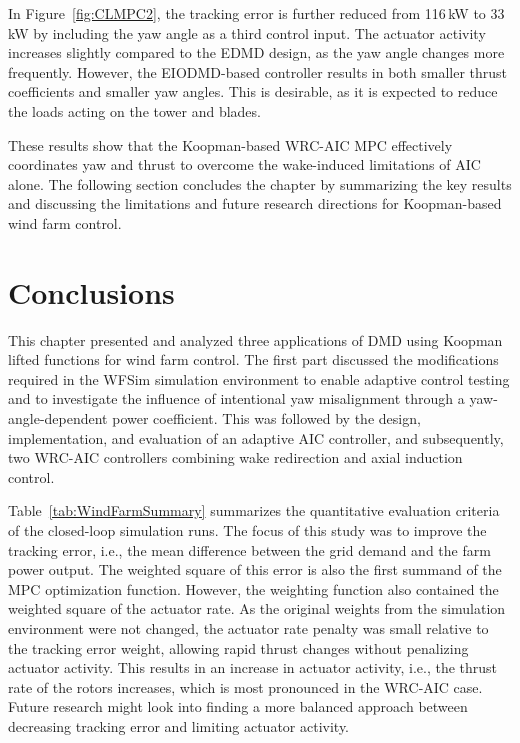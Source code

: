 In Figure~\ref{fig:CLMPC2}, the tracking error is further reduced from 116\,kW to 33\,kW by including the yaw angle as a third control input. The actuator activity increases slightly compared to the EDMD design, as the yaw angle changes more frequently. However, the EIODMD-based controller results in both smaller thrust coefficients and smaller yaw angles. This is desirable, as it is expected to reduce the loads acting on the tower and blades.

These results show that the Koopman-based WRC-AIC MPC effectively coordinates yaw and thrust to overcome the wake-induced limitations of AIC alone. The following section concludes the chapter by summarizing the key results and discussing the limitations and future research directions for Koopman-based wind farm control.


\section{Conclusions}
This chapter presented and analyzed three applications of DMD using Koopman lifted functions
for wind farm control. The first part discussed the modifications required in the WFSim simulation
environment to enable adaptive control testing and to investigate the influence of intentional yaw
misalignment through a yaw-angle-dependent power coefficient. This was followed by the design,
implementation, and evaluation of an adaptive AIC controller, and subsequently, two WRC-AIC
controllers combining wake redirection and axial induction control.

Table~\ref{tab:WindFarmSummary} summarizes the quantitative evaluation criteria of the
closed-loop simulation runs. The focus of this study was to improve the tracking error, i.e., the
mean difference between the grid demand and the farm power output. The weighted square of
this error is also the first summand of the MPC optimization function. However, the weighting
function also contained the weighted square of the actuator rate. As the original weights from
the simulation environment were not changed, the actuator rate penalty was small relative to
the tracking error weight, allowing rapid thrust changes without penalizing actuator activity.
This results in an increase in actuator activity, i.e., the thrust rate of the rotors increases,
which is most pronounced in the WRC-AIC case. Future research might look into finding a
more balanced approach between decreasing tracking error and limiting actuator activity.

